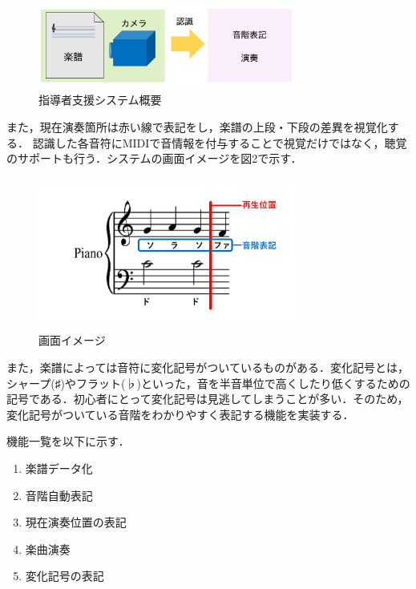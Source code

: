 \documentclass[twocolumn,10pt,a4j]{jsarticle}
\begin{document}
\begin{figure}[h]
\begin{center}
 \includegraphics[clip,width=85mm,height=28mm]{image.pdf}
\end{center}
 \caption{指導者支援システム概要}
 \label{fig:教科書}
\end{figure}

また，現在演奏箇所は赤い線で表記をし，楽譜の上段・下段の差異を視覚化する．
認識した各音符にMIDIで音情報を付与することで視覚だけではなく，聴覚のサポートも行う．システムの画面イメージを図2で示す．

\begin{figure}[h]
\begin{center}
 \includegraphics[clip,width=85mm,height=50mm]{image2.pdf}
\end{center}
 \caption{画面イメージ}
 \label{fig:教科書}
\end{figure}

また，楽譜によっては音符に変化記号がついているものがある．変化記号とは，シャープ(♯)やフラット(♭)といった，音を半音単位で高くしたり低くするための記号である．初心者にとって変化記号は見逃してしまうことが多い．そのため，変化記号がついている音階をわかりやすく表記する機能を実装する．

機能一覧を以下に示す．

\begin{enumerate}
\renewcommand {\labelenumi}{(\arabic{enumi})}
\item 楽譜データ化
\item 音階自動表記
\item 現在演奏位置の表記
\item 楽曲演奏
\item 変化記号の表記
\end{enumerate}
\end{document}
